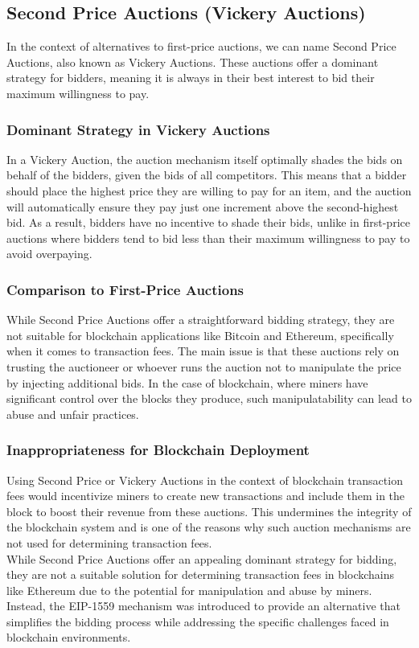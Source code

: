 \subsection{Second Price Auctions (Vickery Auctions)}
In the context of alternatives to first-price auctions, we can name Second Price Auctions, also known as Vickery Auctions. These auctions offer a dominant strategy for bidders, meaning it is always in their best interest to bid their maximum willingness to pay.

\subsubsection{Dominant Strategy in Vickery Auctions}
In a Vickery Auction, the auction mechanism itself optimally shades the bids on behalf of the bidders, given the bids of all competitors. This means that a bidder should place the highest price they are willing to pay for an item, and the auction will automatically ensure they pay just one increment above the second-highest bid. As a result, bidders have no incentive to shade their bids, unlike in first-price auctions where bidders tend to bid less than their maximum willingness to pay to avoid overpaying.

\subsubsection{Comparison to First-Price Auctions}
While Second Price Auctions offer a straightforward bidding strategy, they are not suitable for blockchain applications like Bitcoin and Ethereum, specifically when it comes to transaction fees. The main issue is that these auctions rely on trusting the auctioneer or whoever runs the auction not to manipulate the price by injecting additional bids. In the case of blockchain, where miners have significant control over the blocks they produce, such manipulatability can lead to abuse and unfair practices.

\subsubsection{Inappropriateness for Blockchain Deployment}
Using Second Price or Vickery Auctions in the context of blockchain transaction fees would incentivize miners to create new transactions and include them in the block to boost their revenue from these auctions. This undermines the integrity of the blockchain system and is one of the reasons why such auction mechanisms are not used for determining transaction fees.\\
While Second Price Auctions offer an appealing dominant strategy for bidding, they are not a suitable solution for determining transaction fees in blockchains like Ethereum due to the potential for manipulation and abuse by miners. Instead, the EIP-1559 mechanism was introduced to provide an alternative that simplifies the bidding process while addressing the specific challenges faced in blockchain environments.

